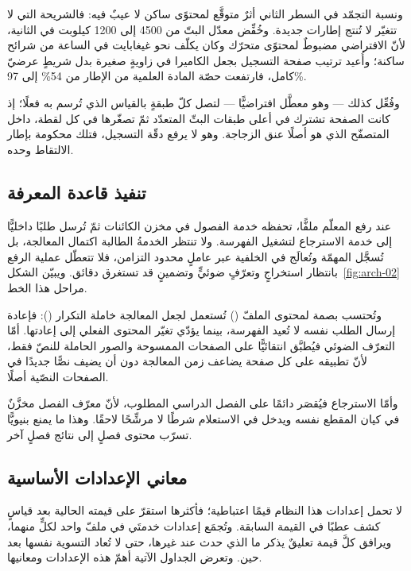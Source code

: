 ونسبة التجمّد في السطر الثاني أثرٌ متوقَّع لمحتوًى ساكن لا عيبٌ فيه: فالشريحة التي لا تتغيّر لا تُنتج إطارات جديدة. وخُفِّض معدّل البتّ من 4500 إلى 1200 كيلوبت في الثانية، لأنّ الافتراضي مضبوطٌ لمحتوًى متحرّك وكان يكلّف نحو غيغابايت في الساعة من شرائح ساكنة؛ وأُعيد ترتيب صفحة التسجيل بجعل الكاميرا في زاويةٍ صغيرة بدل شريطٍ عرضيّ كامل، فارتفعت حصّة المادة العلمية من الإطار من 54\% إلى 97\%.

وفُعِّل كذلك  — وهو معطَّل افتراضيًّا — لتصل كلّ طبقةٍ بالقياس الذي تُرسم به فعلًا؛ إذ كانت الصفحة تشترك في أعلى طبقات البثّ المتعدّد ثمّ تصغّرها في كل لقطة، داخل المتصفّح الذي هو أصلًا عنق الزجاجة. وهو لا يرفع دقّة التسجيل، فتلك محكومة بإطار الالتقاط وحده.

\subsection{تنفيذ قاعدة المعرفة}

عند رفع المعلّم ملفًّا، تحفظه خدمة الفصول في مخزن الكائنات ثمّ تُرسل طلبًا داخليًّا إلى خدمة الاسترجاع لتشغيل الفهرسة. ولا تنتظر الخدمةُ الطالبة اكتمال المعالجة، بل تُسجَّل المهمّة وتُعالَج في الخلفية عبر عاملٍ محدود التزامن، فلا تتعطّل عملية الرفع بانتظار استخراجٍ وتعرّفٍ ضوئيٍّ وتضمينٍ قد تستغرق دقائق. ويبيّن الشكل~\ref{fig:arch-02} مراحل هذا الخط.

وتُحتسب بصمة لمحتوى الملفّ () تُستعمل لجعل المعالجة خاملة التكرار (): فإعادة إرسال الطلب نفسه لا تُعيد الفهرسة، بينما يؤدّي تغيّر المحتوى الفعلي إلى إعادتها. أمّا التعرّف الضوئي فيُطبَّق انتقائيًّا على الصفحات الممسوحة والصور الحاملة للنصّ فقط، لأنّ تطبيقه على كل صفحة يضاعف زمن المعالجة دون أن يضيف نصًّا جديدًا في الصفحات النصّية أصلًا.

وأمّا الاسترجاع فيُقصَر دائمًا على الفصل الدراسي المطلوب، لأنّ معرّف الفصل مخزَّنٌ في كيان المقطع نفسه ويدخل في الاستعلام شرطًا لا مرشِّحًا لاحقًا. وهذا ما يمنع بنيويًّا تسرّب محتوى فصلٍ إلى نتائج فصلٍ آخر.

\subsection{معاني الإعدادات الأساسية}
\label{subsec:settings}

لا تحمل إعدادات هذا النظام قيمًا اعتباطية؛ فأكثرها استقرّ على قيمته الحالية بعد قياسٍ كشف عطبًا في القيمة السابقة. وتُجمَع إعدادات خدمتَي  في ملفّ  واحد لكلٍّ منهما، ويرافق كلَّ قيمة تعليقٌ يذكر ما الذي حدث عند غيرها، حتى لا تُعاد التسوية نفسها بعد حين. وتعرض الجداول الآتية أهمّ هذه الإعدادات ومعانيها.

